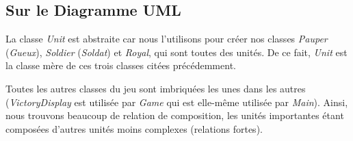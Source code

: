 \documentclass[11pt, a4paper, oneside, portrait]{article}
\begin{document}
        \subsection*{Sur le Diagramme UML}
            La classe \emph{Unit} est abstraite car nous l'utilisons pour créer nos classes \emph{Pauper} (\emph{Gueux}), \emph{Soldier} (\emph{Soldat}) et \emph{Royal}, qui sont toutes des unités.
            De ce fait, \emph{Unit} est la classe mère de ces trois classes citées précédemment.

            Toutes les autres classes du jeu sont imbriquées les unes dans les autres (\emph{VictoryDisplay} est utilisée par \emph{Game} qui est elle-même utilisée par \emph{Main}).
            Ainsi, nous trouvons beaucoup de relation de composition, les unités importantes étant composées d'autres unités moins complexes (relations fortes).


    
\end{document}
